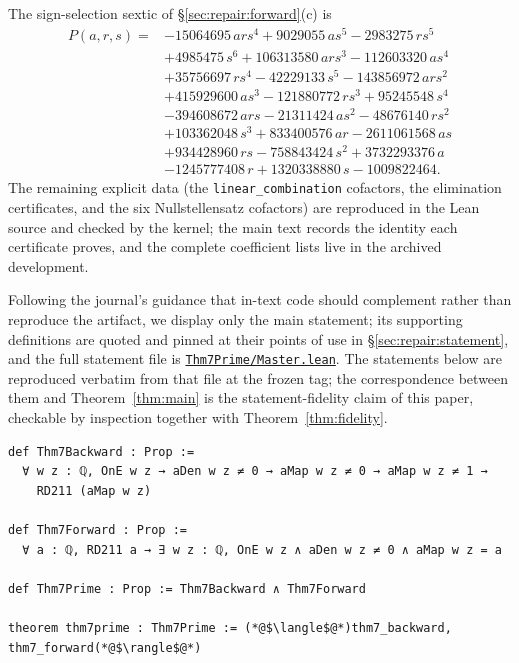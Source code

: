 \documentclass[11pt]{amsart}
\newcommand{\repourl}{https://github.com/hirokifukui/rd-quartics-classification}
\newcommand{\repotag}{v1.1.0}
\newcommand{\leanfile}[1]{\href{\repourl/blob/\repotag/#1}{\texttt{#1}}}
\begin{document}
The sign-selection sextic of \S\ref{sec:repair:forward}(c) is
\begin{align*}
P(a,r,s) ={}& -15064695\,ars^4 + 9029055\,as^5 - 2983275\,rs^5\\
&+ 4985475\,s^6 + 106313580\,ars^3 - 112603320\,as^4\\
&+ 35756697\,rs^4 - 42229133\,s^5 - 143856972\,ars^2\\
&+ 415929600\,as^3 - 121880772\,rs^3 + 95245548\,s^4\\
&- 394608672\,ars - 21311424\,as^2 - 48676140\,rs^2\\
&+ 103362048\,s^3 + 833400576\,ar - 2611061568\,as\\
&+ 934428960\,rs - 758843424\,s^2 + 3732293376\,a\\
&- 1245777408\,r + 1320338880\,s - 1009822464 .
\end{align*}
The remaining explicit data (the \texttt{linear\_combination} cofactors,
the elimination certificates, and the six Nullstellensatz cofactors) are
reproduced in the Lean source and checked by the kernel; the main text
records the identity each certificate proves, and the complete
coefficient lists live in the archived development.

Following the journal's guidance that in-text code should complement
rather than reproduce the artifact, we display only the main statement;
its supporting definitions are quoted and pinned at their points of use
in \S\ref{sec:repair:statement}, and the full statement file is
\leanfile{Thm7Prime/Master.lean}.  The statements below are reproduced
verbatim from that file at the frozen tag; the correspondence between
them and Theorem~\ref{thm:main} is the statement-fidelity claim of this
paper, checkable by inspection together with
Theorem~\ref{thm:fidelity}.

\begin{lstlisting}
def Thm7Backward : Prop :=
  ∀ w z : ℚ, OnE w z → aDen w z ≠ 0 → aMap w z ≠ 0 → aMap w z ≠ 1 →
    RD211 (aMap w z)

def Thm7Forward : Prop :=
  ∀ a : ℚ, RD211 a → ∃ w z : ℚ, OnE w z ∧ aDen w z ≠ 0 ∧ aMap w z = a

def Thm7Prime : Prop := Thm7Backward ∧ Thm7Forward

theorem thm7prime : Thm7Prime := (*@$\langle$@*)thm7_backward, thm7_forward(*@$\rangle$@*)
\end{lstlisting}

\end{document}
